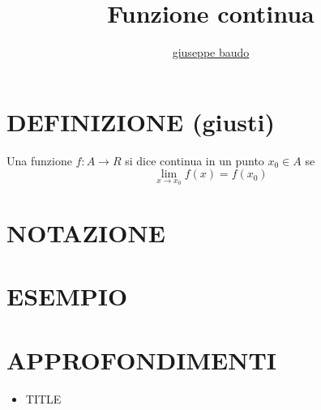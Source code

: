 \documentclass[a4paper,10pt]{article}
\title{Funzione continua}
\author{\href{http://www.baudo.hol.es}{giuseppe baudo}}
\begin{document}
\maketitle

\section{DEFINIZIONE (giusti)}
Una funzione $f:A \to R$ si dice continua in un punto $x_0 \in A$ se 
\[
\lim_{x \to x_0} f(x) = f(x_0)
\]
\section{NOTAZIONE}

\section{ESEMPIO}

\section{APPROFONDIMENTI}
\begin{itemize}
 \item TITLE
\end{itemize}
\end{document}
